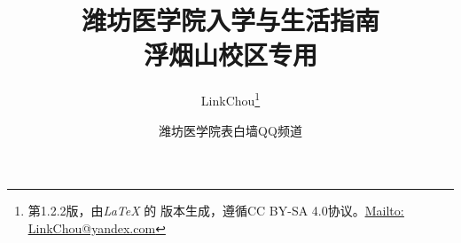 \documentclass[a4paper,twoside,onecolumn,12pt]{ctexrep}
\renewcommand{\thefootnote}{\fnsymbol{footnote}}
\begin{document}



\title{\Huge{\textbf{潍坊医学院入学与生活指南}\\\large{浮烟山校区专用}}}
\bigbreak
\author{LinkChou\thanks{第1.2.2版，由\textit{\LaTeX} 的\textit{\LaTeXe} 版本生成，遵循CC BY-SA 4.0协议。\uline{\href{Mailto:LinkChou@yandex.com}{Mailto: LinkChou@yandex.com}}}\and 潍坊医学院表白墙QQ频道}
\date{\DTMnow}
\maketitle

\setlength{\parskip}{0.8em minus 5pt}
\renewcommand{\thefootnote}{\arabic{footnote}}

\tableofcontents
\newpage















\end{document}
